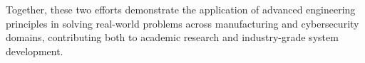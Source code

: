 \documentclass[12pt, twoside, a4paper]{report}
\begin{document}
Together, these two efforts demonstrate the application of advanced engineering principles in solving real-world problems across manufacturing and cybersecurity domains, contributing both to academic research and industry-grade system development.






\baselineskip=16pt	%


\renewcommand{\bibname}{References}

\end{document}
